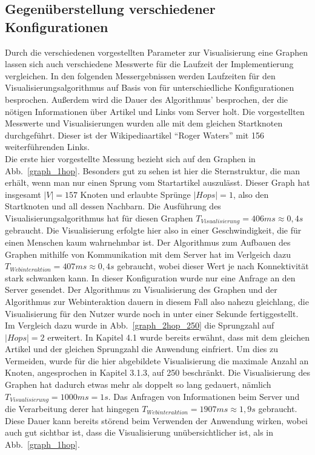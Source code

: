 \documentclass[12pt, a4paper]{article}
\begin{document}
\subsection{Gegenüberstellung verschiedener Konfigurationen}
Durch die verschiedenen vorgestellten Parameter zur Visualisierung eine Graphen lassen sich auch verschiedene Messwerte für die Laufzeit der Implementierung vergleichen. In den folgenden Messergebnissen werden Laufzeiten für den Visualisierungsalgorithmus auf Basis von  für unterschiedliche Konfigurationen besprochen. Außerdem wird die Dauer des Algorithmus' besprochen, der die nötigen Informationen über Artikel und Links vom Server holt. Die vorgestellten Messwerte und Visualisierungen wurden alle mit dem gleichen Startknoten durchgeführt. Dieser ist der Wikipediaartikel "`Roger Waters"' mit 156 weiterführenden Links.\\

Die erste hier vorgestellte Messung bezieht sich auf den Graphen in Abb.~\ref{graph_1hop}. Besonders gut zu sehen ist hier die Sternstruktur, die man erhält, wenn man nur einen Sprung vom Startartikel auszulässt. Dieser Graph hat insgesamt $|V|=157$ Knoten und erlaubte Sprünge $|Hops|=1$, also den Startknoten und all dessen Nachbarn. Die Ausführung des Visualisierungsalgorithmus hat für diesen Graphen $T_{Visualisierung}=406 ms \approx 0,4 s$ gebraucht. Die Visualisierung erfolgte hier also in einer Geschwindigkeit, die für einen Menschen kaum wahrnehmbar ist. Der Algorithmus zum Aufbauen des Graphen mithilfe von Kommunikation mit dem Server hat im Verlgeich dazu $T_{Webinteraktion} = 407 ms \approx 0,4 s$ gebraucht, wobei dieser Wert je nach Konnektivität stark schwanken kann. In dieser Konfiguration wurde nur eine Anfrage an den Server gesendet. Der Algorithmus zu Visualisierung des Graphen und der Algorithmus zur Webinteraktion dauern in diesem Fall also nahezu gleichlang, die Visualisierung für den Nutzer wurde noch in unter einer Sekunde fertiggestellt.\\

Im Vergleich dazu wurde in Abb.~\ref{graph_2hop_250} die Sprungzahl auf $|Hops|=2$ erweitert. In Kapitel 4.1 wurde bereits erwähnt, dass mit dem gleichen Artikel und der gleichen Sprungzahl die Anwendung einfriert. Um dies zu Vermeiden, wurde für die hier abgebildete Visualisierung die maximale Anzahl an Knoten, angesprochen in Kapitel 3.1.3, auf 250 beschränkt. Die Visualisierung des Graphen hat dadurch etwas mehr als doppelt so lang gedauert, nämlich $T_{Visualisierung}=1000 ms = 1 s$. Das Anfragen von Informationen beim Server und die Verarbeitung derer hat hingegen $T_{Webinteraktion}=1907 ms \approx 1,9 s$ gebraucht. Diese Dauer kann bereits störend beim Verwenden der Anwendung wirken, wobei auch gut sichtbar ist, dass die Visualisierung unübersichtlicher ist, als in Abb.~\ref{graph_1hop}.\\
\end{document}
